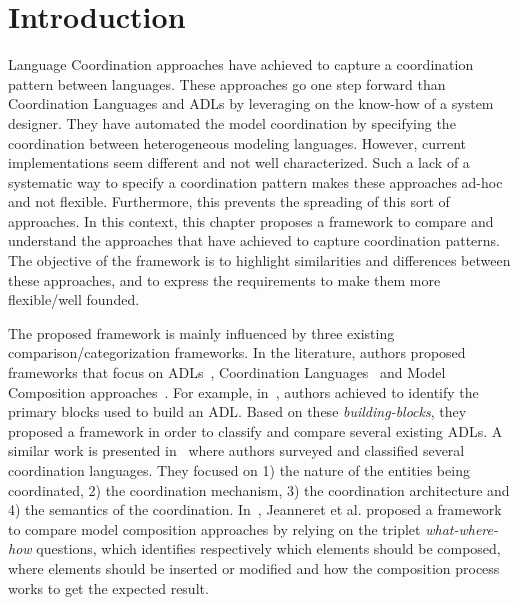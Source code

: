 \section{Introduction}
Language Coordination approaches have achieved to capture a coordination pattern between languages. These approaches go one step forward than Coordination Languages and ADLs by leveraging on the know-how of a system designer. They have automated the model coordination by specifying the coordination between heterogeneous modeling languages. However, current implementations seem different and not well characterized. Such a lack of a systematic way to specify a coordination pattern makes these approaches ad-hoc and not flexible. Furthermore, this prevents the spreading of this sort of approaches. In this context, this chapter proposes a framework to compare and understand the approaches that have achieved to capture coordination patterns. The objective of the framework is to highlight similarities and differences between these approaches, and to express the requirements to make them more flexible/well founded.


The proposed framework is mainly influenced by three existing comparison/categorization frameworks. In the literature, authors proposed frameworks that focus on ADLs~\cite{frameadlsbib}, Coordination Languages~\cite{coordmodels} and Model Composition approaches~\cite{framecompoas}. For example, in~\cite{frameadlsbib}, authors achieved to identify the primary blocks used to build an ADL. Based on these \emph{building-blocks}, they proposed a framework in order to classify and compare several existing ADLs. A similar work is presented in~\cite{coordmodels} where authors surveyed and classified several coordination languages. They focused on 1) the nature of the entities being coordinated, 2) the coordination mechanism, 3) the coordination architecture and 4) the semantics of the coordination. In~\cite{framecompoas}, Jeanneret et al. proposed a framework to compare model composition approaches by relying on the triplet \emph{what-where-how} questions, which identifies respectively which elements should be composed, where elements should be inserted or modified and how the composition process works to get the expected result. 

